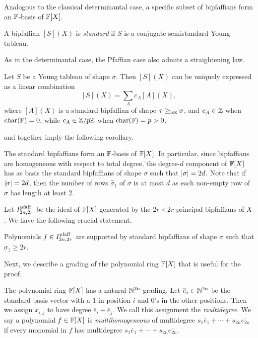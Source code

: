 \documentclass[letterpaper, 11pt]{amsart}
\begin{document}
Analogous to the classical determinantal case, a specific subset of bipfaffians form an $\mathbb{F}$-basis of $\mathbb{F}[X]$.
\begin{defn}\label{defn:pfaff_std}
    A bipfaffian $[S](X)$ is \emph{standard} if $S$ is a conjugate semistandard Young tableau.
\end{defn}

As in the determinantal case, the Pfaffian case also admits a straightening law.

\begin{thrm}\label{thrm:pfaff_straightening}
    Let $S$ be a Young tableau of shape $\sigma$.
    Then $[S](X)$ can be uniquely expressed as a linear combination
    \[
        [S](X) = \sum_{A} c_{A} [A](X),
    \]
    where $[A](X)$ is a standard bipfaffian of shape $\tau \geq_{\operatorname{lex}} \sigma$, and $c_{A} \in \mathbb{Z}$ when $\operatorname{char}(\mathbb{F}) = 0$, while $c_{A} \in \mathbb{Z}/p\mathbb{Z}$ when $\operatorname{char}(\mathbb{F}) = p > 0$.
\end{thrm}

 and  together imply the following corollary.

\begin{cor}\label{cor:pfaff-basis}
The standard bipfaffians form an $\mathbb{F}$-basis of $\mathbb{F}[X]$.
In particular, since bipfaffians are homogeneous with respect to total degree, the degree-$d$ component of $\mathbb{F}[X]$ has as basis the standard bipfaffians of shape $\sigma$ such that $\abs{\sigma} = 2d$.
Note that if $\abs{\sigma} = 2d$, then the number of rows $\widehat{\sigma}_1$ of $\sigma$ is at most $d$ as each non-empty row of $\sigma$ has length at least $2$.
\end{cor}

Let $I^{\operatorname{pfaff}}_{2n, 2r}$ be the ideal of $\mathbb{F}[X]$ generated by the $2r \times 2r$ principal bipfaffians of $X$.
We have the following crucial statement.
\begin{prop}[{\cite[\S 5]{HT92}}]\label{prop:pfaff_shape}
    Polynomials $f \in I^{\operatorname{pfaff}}_{2n, 2r}$ are supported by standard bipfaffians of shape $\sigma$ such that $\sigma_1 \geq 2r$.
\end{prop}

Next, we describe a grading of the polynomial ring $\mathbb{F}[X]$ that is useful for the proof.

\begin{defn}\label{defn:multideg_pfaff}
    The polynomial ring $\mathbb{F}[X]$ has a natural $\mathbb{N}^{2n}$-grading.
    Let $\overline{e}_i \in \mathbb{N}^{2n}$ be the standard basis vector with a $1$ in position $i$ and $0$'s in the other positions.
    Then we assign $x_{i, j}$ to have degree $\overline{e}_i + \overline{e}_j$.
    We call this assignment the \emph{multidegree}.
    We say a polynomial $f \in \mathbb{F}[X]$ is \emph{multihomogeneous} of multidegree $s_1 \overline{e}_1 + \cdots + s_{2n} \overline{e_{2n}}$ if every monomial in $f$ has multidegree $s_1 \overline{e}_1 + \cdots + s_{2n} \overline{e_{2n}}$.
\end{defn}
\end{document}
